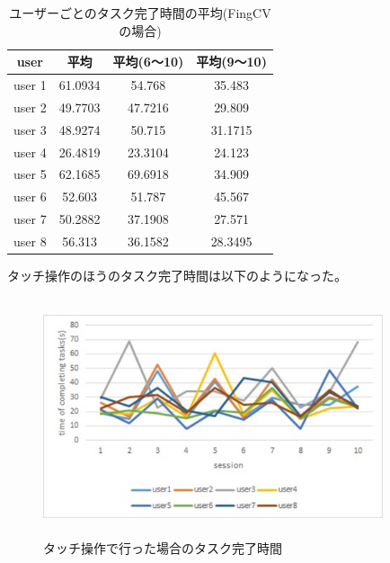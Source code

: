 \documentclass[11pt,a4j, titlepage]{jarticle} %
\begin{document}
\begin{table}[H]
	\begin{center}
	\begin{tabular}{|c|c|c|c|} \hline
		user & 平均 & 平均(6～10) & 平均(9～10)\\ \hline \hline
		user 1 & 61.0934 & 54.768 & 35.483\\
		user 2 & 49.7703 & 47.7216 & 29.809\\
		user 3 & 48.9274 &  50.715 & 31.1715\\
		user 4 & 26.4819 & 23.3104 & 24.123\\
		user 5 & 62.1685 & 69.6918 & 34.909\\
		user 6 & 52.603 & 51.787 & 45.567\\
		user 7 & 50.2882 & 37.1908 & 27.571\\
		user 8 & 56.313 & 36.1582 & 28.3495\\ \hline
	\end{tabular}
	\caption{ユーザーごとのタスク完了時間の平均(FingCVの場合)}
	\label{table11}
	\end{center}
\end{table}

タッチ操作のほうのタスク完了時間は以下のようになった。

\begin{figure}[H]
	\centering
	\includegraphics[width=10cm,height=7cm]{touchgraph.eps}
	\caption{タッチ操作で行った場合のタスク完了時間}
	\label{fig:f26}
\end{figure}
\end{document}
